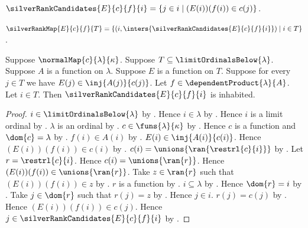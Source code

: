 \begin{definition}\label{silver_rank_candidates}
    $\silverRankCandidates{E}{c}{f}{i}
        =\{j\in i\mid (E(i))(f(i))\in c(j)\}$.
\end{definition}

\begin{definition}\label{silver_rank_map}
    $\silverRankMap{E}{c}{f}{T}
        =\{(i,\inters{\silverRankCandidates{E}{c}{f}{i}})
            \mid i\in T\}$.
\end{definition}

\begin{proposition}\label{silver_rank_candidates_inhabited}
    Suppose $\normalMap{c}{\lambda}{\kappa}$.
    Suppose $T\subseteq\limitOrdinalsBelow{\lambda}$.
    Suppose $A$ is a function on $\lambda$.
    Suppose $E$ is a function on $T$.
    Suppose for every $j\in T$ we have
        $E(j)\in\inj{A(j)}{c(j)}$.
    Let $f\in\dependentProduct{\lambda}{A}$.
    Let $i\in T$.
    Then $\silverRankCandidates{E}{c}{f}{i}$ is inhabited.
\end{proposition}
\begin{proof}
    $i\in\limitOrdinalsBelow{\lambda}$ by .
    Hence $i\in\lambda$ by .
    Hence $i$ is a limit ordinal by .
    $\lambda$ is an ordinal by .
    $c\in\funs{\lambda}{\kappa}$
        by .
    Hence $c$ is a function and $\dom{c}=\lambda$
        by .
    $f(i)\in A(i)$ by .
    $E(i)\in\inj{A(i)}{c(i)}$.
    Hence $(E(i))(f(i))\in c(i)$ by .
    $c(i)=\unions{\ran{\restrl{c}{i}}}$
        by .
    Let $r=\restrl{c}{i}$.
    Hence $c(i)=\unions{\ran{r}}$.
    Hence $(E(i))(f(i))\in\unions{\ran{r}}$.
    Take $z\in\ran{r}$ such that $(E(i))(f(i))\in z$
        by .
    $r$ is a function by .
    $i\subseteq\lambda$ by .
    Hence $\dom{r}=i$
        by .
    Take $j\in\dom{r}$ such that $r(j)=z$
        by .
    Hence $j\in i$.
    $r(j)=c(j)$ by .
    Hence $(E(i))(f(i))\in c(j)$.
    Hence $j\in\silverRankCandidates{E}{c}{f}{i}$
        by .
\end{proof}

